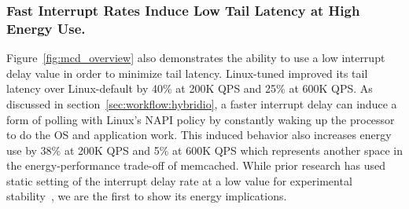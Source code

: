 
\subsubsection{Fast Interrupt Rates Induce Low Tail Latency at High Energy Use.} 
\label{sec:mcd:fastitr} 
Figure~\ref{fig:mcd_overview} also demonstrates the ability to use a low interrupt delay value in order to minimize tail latency. Linux-tuned improved its tail latency over Linux-default by 40\% at 200K QPS and 25\% at 600K QPS. As discussed in section~\ref{sec:workflow:hybridio}, a faster interrupt delay can induce a form of polling with Linux's NAPI policy by constantly waking up the processor to do the OS and application work. This induced behavior also increases energy use by 38\% at 200K QPS and 5\% at 600K QPS which represents another space in the energy-performance trade-off of memcached. While prior research has used static setting of the interrupt delay rate at a low value for experimental stability~\cite{10.1145/2812806, 10.5555/3323234.3323265}, we are the first to show its energy implications.





